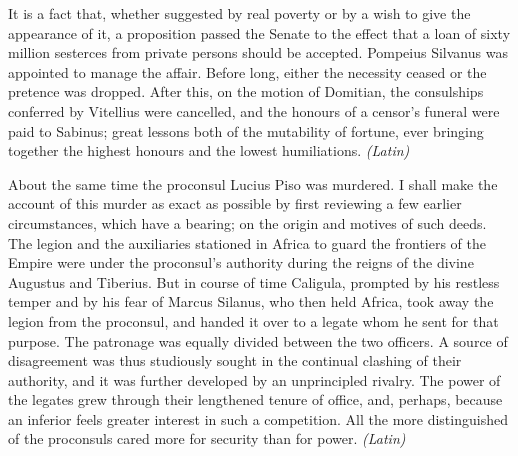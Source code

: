 
It is a fact that, whether suggested by real poverty or by a wish to give the appearance of it, a proposition passed the Senate to the effect that a loan of sixty million sesterces from private persons should be accepted. Pompeius Silvanus was appointed to manage the affair. Before long, either the necessity ceased or the pretence was dropped. After this, on the motion of Domitian, the consulships conferred by Vitellius were cancelled, and the honours of a censor's funeral were paid to Sabinus; great lessons both of the mutability of fortune, ever bringing together the highest honours and the lowest humiliations. \emph{(Latin)}


About the same time the proconsul Lucius Piso was murdered. I shall make the account of this murder as exact as possible by first reviewing a few earlier circumstances, which have a bearing; on the origin and motives of such deeds. The legion and the auxiliaries stationed in Africa to guard the frontiers of the Empire were under the proconsul's authority during the reigns of the divine Augustus and Tiberius. But in course of time Caligula, prompted by his restless temper and by his fear of Marcus Silanus, who then held Africa, took away the legion from the proconsul, and handed it over to a legate whom he sent for that purpose. The patronage was equally divided between the two officers. A source of disagreement was thus studiously sought in the continual clashing of their authority, and it was further developed by an unprincipled rivalry. The power of the legates grew through their lengthened tenure of office, and, perhaps, because an inferior feels greater interest in such a competition. All the more distinguished of the proconsuls cared more for security than for power. \emph{(Latin)}


